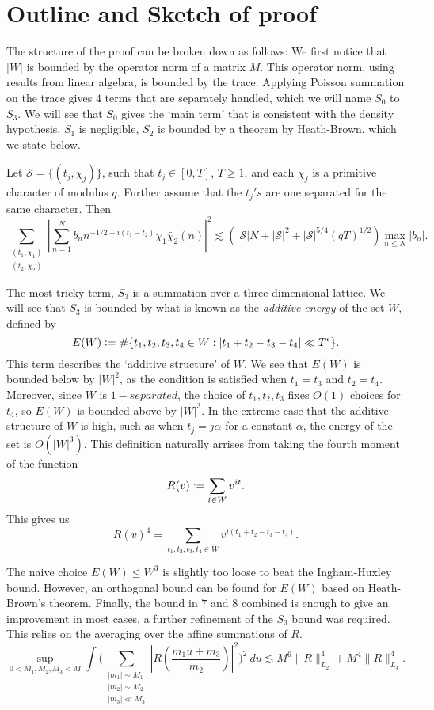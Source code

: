 \section{Outline and Sketch of proof}
The structure of the proof can be broken down as follows: We first notice that $|W|$ is bounded by the operator norm of a matrix $M$. This operator norm, using results from linear algebra, is bounded by the trace. Applying Poisson summation on the trace gives $4$ terms that are separately handled, which we will name $S_0$ to $S_3$. We will see that $S_0$ gives the `main term' that is consistent with the density hypothesis, $S_1$ is negligible, $S_2$ is bounded by a theorem by Heath-Brown, which we state below. 
\begin{theorem}
    \label{heathbrown}
    Let $\mathcal{S}=\{(t_j,\chi_j)\}$, such that $t_j\in [0,T]$, $T\geq 1$, and each $\chi_j$ is a primitive character of modulus $q$. Further assume that the $t_j's$ are one separated for the same character. Then 
    \[
        \sum_{\substack{(t_1,\chi_1)\\(t_2,\chi_2)}}\left|\sum_{n=1}^{N} b_n n^{-1/2 -i(t_1-t_2)}\chi_1\bar{\chi}_2(n)\right|^2 \lesssim  (|\mathcal{S}|N+ |\mathcal{S}|^2 + |\mathcal{S}|^{5/4}(qT)^{1/2}) \max_{n\leq N} |b_n|.
    \]
\end{theorem}
The most tricky term, $S_3$ is a summation over a three-dimensional lattice. We will see that $S_3$ is bounded by what is known as the \textit{additive energy} of the set $W$, defined by\[
    E(W)\mathrel{\mathop:}= \#\{t_1,t_2,t_3,t_4\in W : |t_1+t_2-t_3-t_4|\ll T^\epsilon\}.
\]
This term describes the `additive structure' of $W$.
We see that $E(W)$ is bounded below by $|W|^2$, as the condition is satisfied when $t_1=t_3$ and $t_2=t_4$. Moreover, since $W$ is $1-separated$, the choice of $t_1,t_2,t_3$ fixes $O(1)$ choices for $t_4$, so $E(W)$ is bounded above by $|W|^3$. In the extreme case that the additive structure of $W$ is high, such as when $t_j=j\alpha$ for a constant $\alpha$, the energy of the set is $O(|W|^3)$. This definition naturally arrises from taking the fourth moment of the function \[
R(v)\mathrel{\mathop:}=\sum_{t\in W} v^{it}.
\] 
This gives us \[
R(v)^4=\sum_{t_1,t_2,t_3,t_4\in W}v^{i(t_1+t_2-t_3-t_4)}.
\]

The naive choice $E(W)\leq W^3$ is slightly too loose to beat the Ingham-Huxley bound. However, an orthogonal bound can be found for $E(W)$ based on Heath-Brown's theorem. Finally, the bound in $7$ and $8$ combined is enough to give an improvement in most cases, a further refinement of the $S_3$ bound was required. This relies on the averaging over the affine summations of $R$.
 \[
        \sup_{0<M_1,M_2,M_3<M} \int\Bigg( \sum_{\substack{|m_1|\sim M_1\\|m_2|\sim M_2 \\ |m_3|\ll M_3}} \left|R\left(\frac{m_1 u+m_3}{m_2}\right)\right|^2\Bigg)^2 \ du \lesssim M^6 \|R\|_{L_2}^4+M^4\|R\|_{L_4}^4.
\] 

